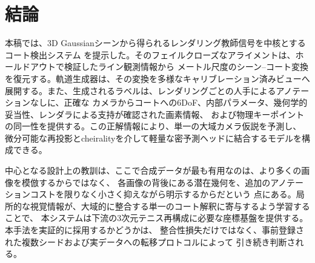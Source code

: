 \section{結論}
\label{sec:conclusion}

本稿では、3D Gaussianシーンから得られるレンダリング教師信号を中核とするコート検出システム
\Method{}を提示した。そのフェイルクローズなアライメントは、ホールドアウトで検証したライン観測情報から
メートル尺度のシーン--コート変換を復元する。軌道生成器は、その変換を多様なキャリブレーション済みビューへ
展開する。また、生成されるラベルは、レンダリングごとの人手によるアノテーションなしに、正確な
カメラからコートへの6DoF、内部パラメータ、幾何学的妥当性、レンダラによる支持が確認された画素情報、
および物理キーポイントの同一性を提供する。この正解情報により、単一の大域カメラ仮説を予測し、
微分可能な再投影とcheiralityを介して軽量な密予測ヘッドに結合するモデルを構成できる。

中心となる設計上の教訓は、ここで合成データが最も有用なのは、より多くの画像を模倣するからではなく、
各画像の背後にある潜在幾何を、追加のアノテーションコストを限りなく小さく抑えながら明示するからだという
点にある。局所的な視覚情報が、大域的に整合する単一のコート解釈に寄与するよう学習することで、
本システムは下流の3次元テニス再構成に必要な座標基盤を提供する。本手法を実証的に採用するかどうかは、
整合性損失だけではなく、事前登録された複数シードおよび実データへの転移プロトコルによって
引き続き判断される。
